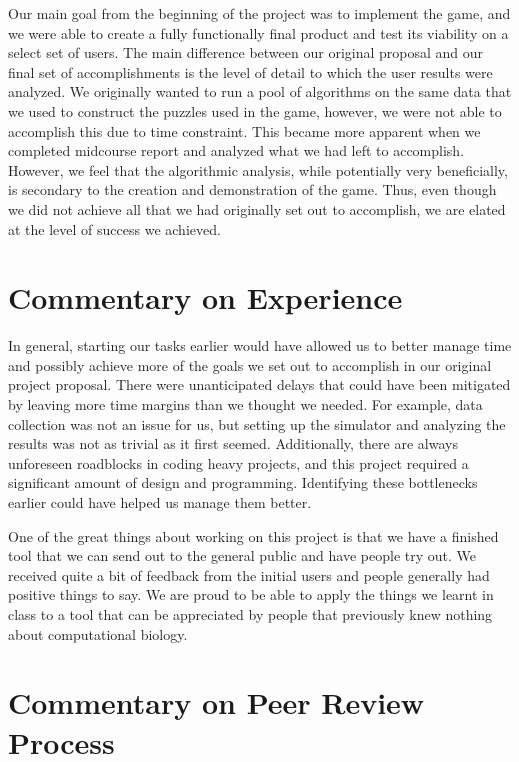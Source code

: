 \documentclass[12pt]{article}
\begin{document}
Our main goal from the beginning of the project was to implement the game, and we were able to create a fully functionally final product and test its viability on a select set of users. The main
difference between our original proposal and our final set of accomplishments is the level of detail to which the user results were analyzed. We originally wanted to run a pool of algorithms
on the same data that we used to construct the puzzles used in the game, however, we were not able to accomplish this due to time constraint. This became more apparent when we
completed midcourse report and analyzed what we had left to accomplish. However, we feel that the
algorithmic analysis, while potentially very beneficially, is secondary to the creation and demonstration of the game. Thus, even though we did not achieve all that we had originally set out to accomplish, we are elated at the level of success we achieved.

\section*{Commentary on Experience}

In general, starting our tasks earlier would have allowed us to better manage time and possibly achieve more of the goals we set out to accomplish in our original project proposal.
There were unanticipated delays that could have been mitigated by leaving more time margins than we thought we needed. For example, data collection was not an issue for us, but
setting up the simulator and analyzing the results was not as trivial as it first seemed. Additionally, there are always unforeseen roadblocks in coding heavy projects, and this project
required a significant amount of design and programming. Identifying these bottlenecks earlier could have helped us manage them better.

One of the great things about working on this project is that we have a finished tool that we can  send out to the general public and have people try out. We received quite a bit of feedback from the initial users and people generally had positive things to say. We are proud to be able to apply the things we learnt in class to a tool that can be appreciated by people that previously knew nothing about computational biology.

\section*{Commentary on Peer Review Process}
\end{document}

